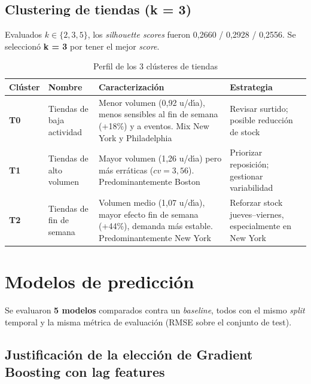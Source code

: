 \documentclass[12pt, a4paper, oneside]{report}
\begin{document}
\subsection{Clustering de tiendas (k = 3)}

Evaluados $k \in \{2, 3, 5\}$, los \textit{silhouette scores} fueron 0,2660 / 0,2928 / 0,2556. Se seleccion\'o \textbf{k = 3} por tener el mejor \textit{score}.

\begin{table}[htbp]
  \centering
  \caption{Perfil de los 3 cl\'usteres de tiendas}
  \label{tab:clusters_tiendas}
  \begin{tabularx}{\textwidth}{C{1.1cm} L{3.6cm} L{4.5cm} X}
    \toprule
    {\color{white}\textbf{Cl\'uster}} &
    {\color{white}\textbf{Nombre}} &
    {\color{white}\textbf{Caracterizaci\'on}} &
    {\color{white}\textbf{Estrategia}} \\
    \midrule
    \textbf{T0} & Tiendas de baja actividad &
    Menor volumen (0,92 u/d\'{\i}a), menos sensibles al fin de semana (+18\%) y a eventos. Mix New York y Philadelphia &
    Revisar surtido; posible reducci\'on de stock \\
    \textbf{T1} & Tiendas de alto volumen &
    Mayor volumen (1,26 u/d\'{\i}a) pero m\'as err\'aticas ($cv=3{,}56$). Predominantemente Boston &
    Priorizar reposici\'on; gestionar variabilidad \\
    \textbf{T2} & Tiendas de fin de semana &
    Volumen medio (1,07 u/d\'{\i}a), mayor efecto fin de semana (+44\%), demanda m\'as estable. Predominantemente New York &
    Reforzar stock jueves--viernes, especialmente en New York \\
    \bottomrule
  \end{tabularx}
\end{table}

\section{Modelos de predicci\'on}

Se evaluaron \textbf{5 modelos} comparados contra un \textit{baseline}, todos con el mismo \textit{split} temporal y la misma m\'etrica de evaluaci\'on (RMSE sobre el conjunto de test).

\subsection{Justificaci\'on de la elecci\'on de Gradient Boosting con lag features}
\end{document}

